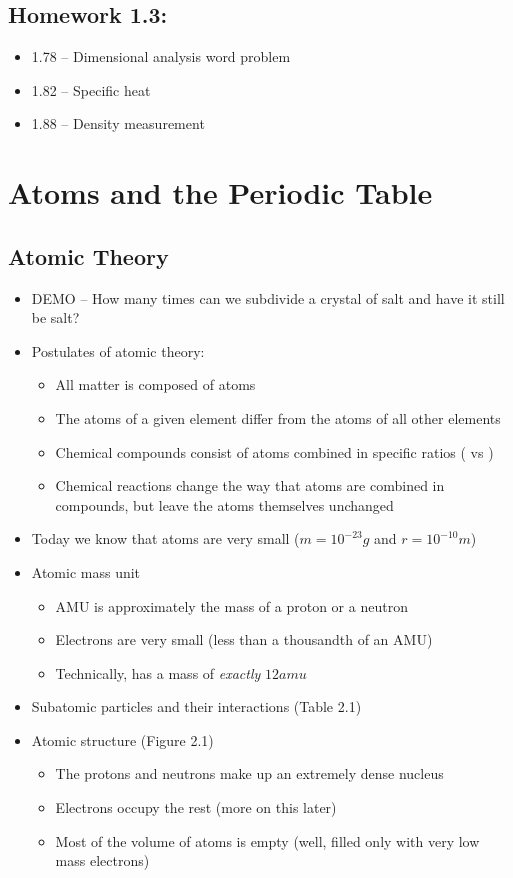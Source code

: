 \documentclass[12pt, openany, letterpaper]{memoir}
\begin{document}
\section*{Homework 1.3:}
	\begin{itemize}
		\item 1.78 -- Dimensional analysis word problem
		\item 1.82 -- Specific heat
		\item 1.88 -- Density measurement
	\end{itemize}

\chapter{Atoms and the Periodic Table}%
\section{Atomic Theory}
\begin{itemize}
	\item DEMO -- How many times can we subdivide a crystal of salt and have it still be salt?
	\item Postulates of atomic theory:
	\begin{itemize}
		\item All matter is composed of atoms
		\item The atoms of a given element differ from the atoms of all other elements
		\item Chemical compounds consist of atoms combined in specific ratios ( vs )
		\item Chemical reactions change the way that atoms are combined in compounds, but leave the atoms themselves unchanged
	\end{itemize}
	\item Today we know that atoms are very small ($m=10^{-23}g$ and $r=10^{-10}m$)
	\item Atomic mass unit
	\begin{itemize}
		\item AMU is approximately the mass of a proton or a neutron
		\item Electrons are very small (less than a thousandth of an AMU)
		\item Technically,  has a mass of \emph{exactly} $12amu$
	\end{itemize}
	\item Subatomic particles and their interactions (Table 2.1)
	\item Atomic structure (Figure 2.1)
	\begin{itemize}
		\item The protons and neutrons make up an extremely dense nucleus
		\item Electrons occupy the rest (more on this later)
		\item Most of the volume of atoms is empty (well, filled only with very low mass electrons)
	\end{itemize}
\end{itemize}
\end{document}
